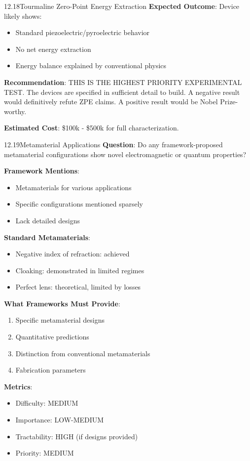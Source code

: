 \begin{openproblem}{12.18}{Tourmaline Zero-Point Energy Extraction}
\textbf{Expected Outcome}: Device likely shows:
\begin{itemize}
    \item Standard piezoelectric/pyroelectric behavior
    \item No net energy extraction
    \item Energy balance explained by conventional physics
\end{itemize}

\textbf{Recommendation}: THIS IS THE HIGHEST PRIORITY EXPERIMENTAL TEST. The devices are specified in sufficient detail to build. A negative result would definitively refute ZPE claims. A positive result would be Nobel Prize-worthy.

\textbf{Estimated Cost}: \$100k - \$500k for full characterization.
\end{openproblem}

\begin{openproblem}{12.19}{Metamaterial Applications}
\textbf{Question}: Do any framework-proposed metamaterial configurations show novel electromagnetic or quantum properties?

\textbf{Framework Mentions}:
\begin{itemize}
    \item Metamaterials for various applications
    \item Specific configurations mentioned sparsely
    \item Lack detailed designs
\end{itemize}

\textbf{Standard Metamaterials}:
\begin{itemize}
    \item Negative index of refraction: achieved
    \item Cloaking: demonstrated in limited regimes
    \item Perfect lens: theoretical, limited by losses
\end{itemize}

\textbf{What Frameworks Must Provide}:
\begin{enumerate}
    \item Specific metamaterial designs
    \item Quantitative predictions
    \item Distinction from conventional metamaterials
    \item Fabrication parameters
\end{enumerate}

\textbf{Metrics}:
\begin{itemize}
    \item Difficulty: MEDIUM
    \item Importance: LOW-MEDIUM
    \item Tractability: HIGH (if designs provided)
    \item Priority: MEDIUM
\end{itemize}
\end{openproblem}


